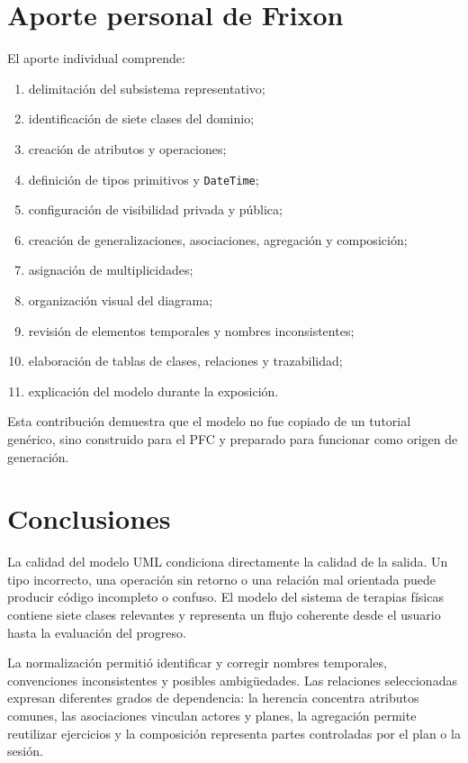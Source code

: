 \section{Aporte personal de Frixon}
El aporte individual comprende:
\begin{enumerate}
  \item delimitación del subsistema representativo;
  \item identificación de siete clases del dominio;
  \item creación de atributos y operaciones;
  \item definición de tipos primitivos y \texttt{DateTime};
  \item configuración de visibilidad privada y pública;
  \item creación de generalizaciones, asociaciones, agregación y composición;
  \item asignación de multiplicidades;
  \item organización visual del diagrama;
  \item revisión de elementos temporales y nombres inconsistentes;
  \item elaboración de tablas de clases, relaciones y trazabilidad;
  \item explicación del modelo durante la exposición.
\end{enumerate}

Esta contribución demuestra que el modelo no fue copiado de un tutorial genérico, sino construido para el PFC y preparado para funcionar como origen de generación.

\section{Conclusiones}
La calidad del modelo UML condiciona directamente la calidad de la salida. Un tipo incorrecto, una operación sin retorno o una relación mal orientada puede producir código incompleto o confuso. El modelo del sistema de terapias físicas contiene siete clases relevantes y representa un flujo coherente desde el usuario hasta la evaluación del progreso.

La normalización permitió identificar y corregir nombres temporales, convenciones inconsistentes y posibles ambigüedades. Las relaciones seleccionadas expresan diferentes grados de dependencia: la herencia concentra atributos comunes, las asociaciones vinculan actores y planes, la agregación permite reutilizar ejercicios y la composición representa partes controladas por el plan o la sesión.

